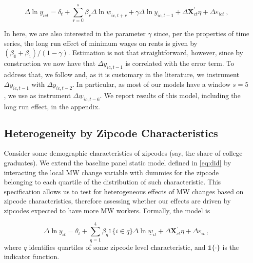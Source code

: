 \begin{equation}\label{eq:ab_panel}
	\Delta \ln y_{ict} = \delta_t
						+ \sum_{r=0}^{s} \beta_r \Delta \ln \underline{w}_{ic,t+r}
						+ \gamma \Delta \ln y_{ic,t-1} + \Delta \mathbf{X}^{'}_{ct}\eta
						+ \Delta \varepsilon_{ict} \ ,
\end{equation}

In here, we are also interested in the parameter $\gamma$ since, per the properties of time
series, the long run effect of minimum wages on rents is given by 
$(\beta_0 + \beta_1)/(1-\gamma)$. %
Estimation is not that straightforward, however, since by construction we now have that 
$\Delta y_{ic,t-1}$ is correlated with the error term. To address that,  we follow 
\textcite{ArellanoBond1991} %
and, as it is customary in the literature, we instrument $\Delta y_{ic,t-1}$ with $\Delta 
y_{ic,t-2}$. In particular, as most of our models have a window $s=5$, we use as instrument 
$\Delta \underline{w}_{ic,t-6}$. We report results of this model, including the long run
effect, in the appendix.

\subsection{Heterogeneity by Zipcode Characteristics}\label{sec:strategy_heterogeneity}

Consider some demographic characteristics of zipcodes (say, the share of college graduates).
We extend the baseline panel static model defined in \autoref{eq:did} by interacting the 
local MW change variable with dummies for the zipcode belonging to each quartile of the 
distribution of such characteristic. This specification allows us to test for heterogeneous effects of MW 
changes based on zipcode characteristics, therefore assessing whether our effects are driven 
by zipcodes expected to have more MW workers. Formally, the model is

\begin{equation}\label{eq:diff_main_hetero} 
    \Delta \ln y_{it} = \theta_t 
    				+ \sum_{q = 1}^4 \beta_q \mathds{1}\{i \in q\} \Delta \ln \underline{w}_{it}
    				+ \Delta \mathbf{X}^{'}_{ct}\eta
    				+ \Delta \varepsilon_{it} \ ,
\end{equation}
where $q$ identifies quartiles of some zipcode level characteristic, and $\mathds{1}\{ \cdot \}$ 
is the indicator function.

